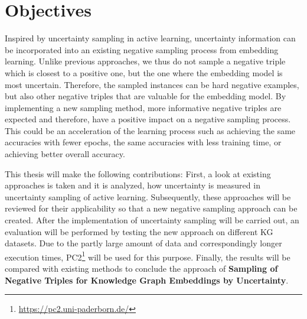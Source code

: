 \section{Objectives}
\label{sec:objectives}

Inspired by uncertainty sampling in active learning,  uncertainty information can be incorporated into an existing negative sampling process from embedding learning.
Unlike previous approaches, we thus do not sample a negative triple which is closest to a positive one, but the one where the embedding model is most uncertain.
Therefore, the sampled instances can be hard negative examples, but also other negative triples that are valuable for the embedding model.
By implementing a new sampling method, more informative negative triples are expected and therefore, have a positive impact on a negative sampling process.
This could be an acceleration of the learning process such as achieving the same accuracies with fewer epochs, the same accuracies with less training time, or achieving better overall accuracy.

This thesis will make the following contributions:
First, a look at existing approaches is taken and it is analyzed, how uncertainty is measured in uncertainty sampling of active learning.
Subsequently, these approaches will be reviewed for their applicability so that a new negative sampling approach can be created.
After the implementation of uncertainty sampling will be carried out, an evaluation will be performed by testing the new approach on different \ac{KG} datasets.
Due to the partly large amount of data and correspondingly longer execution times, \ac{PC2}\footnote{\url{https://pc2.uni-paderborn.de/}} will be used for this purpose.
Finally, the results will be compared with existing methods to conclude the approach of \textbf{Sampling of Negative Triples for Knowledge Graph Embeddings by Uncertainty}.








